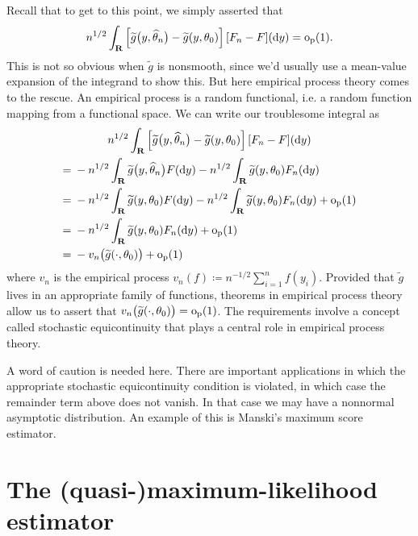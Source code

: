 \documentclass[11pt,letterpaper,reqno,oneside]{article}
\begin{document}
Recall that to get to this point, we simply asserted that
%
\begin{equation*}
	n^{1/2} \int_{\mathbf{R}} 
	\left[ \widetilde{g}\bigl( y, \widehat{\theta}_n \bigr) - \widetilde{g}( y, \theta_0 ) \right] [F_n-F](\mathrm{d} y)
	= \mathrm{o}_{\mathrm{p}}(1) .
\end{equation*}
%
This is not so obvious when $\widetilde{g}$ is nonsmooth, since we'd usually use a mean-value expansion of the integrand to show this. But here empirical process theory comes to the rescue. An empirical process is a random functional, i.e. a random function mapping from a functional space. We can write our troublesome integral as
%
\begin{multline*}
	n^{1/2} \int_{\mathbf{R}} 
	\left[ \widetilde{g}\bigl( y, \widehat{\theta}_n \bigr) - \widetilde{g}( y, \theta_0 ) \right] [F_n-F](\mathrm{d} y)
	\\
	\begin{aligned}
		={}& - n^{1/2} \int_{\mathbf{R}} \widetilde{g}\bigl( y, \widehat{\theta}_n \bigr) F(\mathrm{d} y)
		- n^{1/2} \int_{\mathbf{R}} \widetilde{g}( y, \theta_0 ) F_n(\mathrm{d} y)
		\\
		={}& - n^{1/2} \int_{\mathbf{R}} \widetilde{g}( y, \theta_0 ) F(\mathrm{d} y)
		- n^{1/2} \int_{\mathbf{R}} \widetilde{g}( y, \theta_0 ) F_n(\mathrm{d} y)
		+ \mathrm{o}_{\mathrm{p}}(1)
		\\
		={}& - n^{1/2} \int_{\mathbf{R}} \widetilde{g}( y, \theta_0 ) F_n(\mathrm{d} y)
		+ \mathrm{o}_{\mathrm{p}}(1)
		\\
		={}& - v_n\bigl( \widetilde{g}(\cdot,\theta_0) \bigr) + \mathrm{o}_{\mathrm{p}}(1)
	\end{aligned}
\end{multline*}
%
where $v_n$ is the empirical process $v_n(f) \coloneqq n^{-1/2} \sum_{i=1}^n f(y_i)$. Provided that $\widetilde{g}$ lives in an appropriate family of functions, theorems in empirical process theory allow us to assert that $v_n\bigl( \widetilde{g}(\cdot,\theta_0) \bigr) = \mathrm{o}_{\mathrm{p}}(1)$. The requirements involve a concept called stochastic equicontinuity that plays a central role in empirical process theory.


A word of caution is needed here. There are important applications in which the appropriate stochastic equicontinuity condition is violated, in which case the remainder term above does not vanish. In that case we may have a nonnormal asymptotic distribution. An example of this is Manski's maximum score estimator.



\pagebreak
\section{The (quasi-)maximum-likelihood estimator}
\label{sec:MLE}
\end{document}
